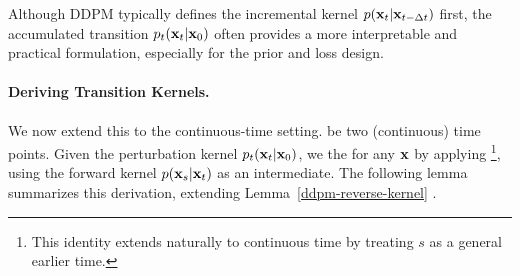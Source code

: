 Although DDPM typically defines the incremental kernel $p({\mathbf{x}}_t|{\mathbf{x}}_{t-\Delta t})$ first, the accumulated transition $p_t({\mathbf{x}}_t|{\mathbf{x}}_0)$ often provides a more interpretable and practical formulation, especially for the prior and loss design.

\paragraph{Deriving Transition Kernels.}
We now extend this to the continuous-time setting.  be two (continuous) time points. Given the perturbation kernel $p_t({\mathbf{x}}_t|{\mathbf{x}}_0)$, we  the  for any ${\mathbf{x}}$ by applying \footnote{This identity extends naturally to continuous time by treating $s$ as a general earlier time.}, using the forward kernel $p({\mathbf{x}}_s|{\mathbf{x}}_t)$ as an intermediate. The following lemma summarizes this derivation, extending Lemma~\ref{ddpm-reverse-kernel} .

